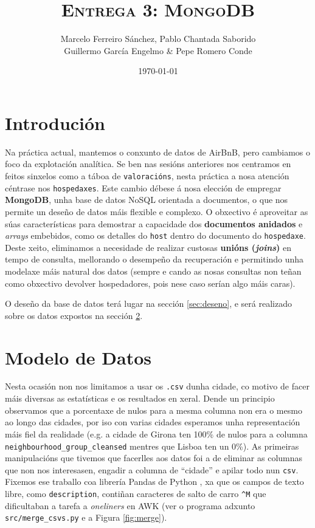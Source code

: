 \documentclass[12pt,a4paper]{article}
\title{\textsc{Entrega 3: MongoDB}}
\author{Marcelo Ferreiro Sánchez, Pablo Chantada Saborido\\  Guillermo García Engelmo \& Pepe Romero Conde}
\date{\today}
\begin{document}
\maketitle

\tableofcontents

\newpage

\section{Introdución}

Na práctica actual, mantemos o conxunto de datos de AirBnB, pero cambiamos o
foco da explotación analítica. Se ben nas sesións anteriores nos centramos en
feitos sinxelos como a táboa de \texttt{valoracións}, nesta práctica a nosa
atención céntrase nos \texttt{hospedaxes}. Este cambio débese á nosa elección de
empregar \textbf{MongoDB}, unha base de datos NoSQL orientada a documentos, o
que nos permite un deseño de datos máis flexible e complexo. O obxectivo é
aproveitar as súas características para demostrar a capacidade dos
\textbf{documentos anidados} e \emph{arrays} embebidos, como os detalles do
\texttt{host} dentro do documento do \texttt{hospedaxe}. Deste xeito, eliminamos
a necesidade de realizar custosas \textbf{unións (\emph{joins})} en tempo de
consulta, mellorando o desempeño da recuperación e permitindo unha modelaxe máis
natural dos datos (sempre e cando as nosas consultas non teñan como obxectivo
devolver hospedadores, pois nese caso serían algo máis caras).

O deseño da base
de datos terá lugar na sección \ref{sec:deseno}, e será realizado sobre os datos
expostos na sección \ref{sec:modeloDatos}.

\section{Modelo de Datos}
\label{sec:modeloDatos}

Nesta ocasión non nos limitamos a usar os \texttt{.csv} dunha cidade, co motivo de facer máis diversas as estatísticas e os resultados en xeral. Dende un principio observamos que a porcentaxe de nulos para a mesma columna non era o mesmo ao longo das cidades, por iso con varias cidades esperamos unha representación máis fiel da realidade (e.g. a cidade de Girona ten 100\% de nulos para a columna \texttt{neighbourhood\_group\_cleansed} mentres que Lisboa ten un 0\%). As primeiras manipulacións que tivemos que facerlles aos datos foi a de eliminar as columnas que non nos interesasen, engadir a columna de ``cidade'' e apilar todo nun \texttt{csv}. Fixemos ese traballo coa librería Pandas \cite{pandas_license} de Python \cite{cpython_license}, xa que os campos de texto libre, como \texttt{description}, contiñan caracteres de salto de carro \texttt{\^{}M} que dificultaban a tarefa a \emph{oneliners} en AWK \cite{gpl3_license} (ver o programa adxunto \texttt{src/merge\_csvs.py} e a Figura \ref{fig:merge}).  
\end{document}
